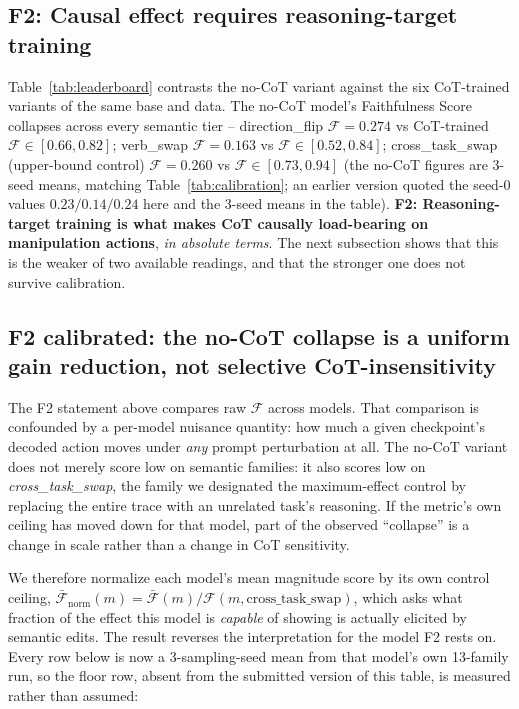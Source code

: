 \documentclass{article}
\begin{document}
\subsection{F2: Causal effect requires reasoning-target training}

Table~\ref{tab:leaderboard} contrasts the no-CoT variant against the six CoT-trained variants of the same base and data. The no-CoT model's Faithfulness Score collapses across every semantic tier -- direction\_flip $\mathcal{F}\!=\!0.274$ vs CoT-trained $\mathcal{F}\!\in\![0.66, 0.82]$; verb\_swap $\mathcal{F}\!=\!0.163$ vs $\mathcal{F}\!\in\![0.52, 0.84]$; cross\_task\_swap (upper-bound control) $\mathcal{F}\!=\!0.260$ vs $\mathcal{F}\!\in\![0.73, 0.94]$ (the no-CoT figures are 3-seed means, matching Table~\ref{tab:calibration}; an earlier version quoted the seed-0 values $0.23/0.14/0.24$ here and the 3-seed means in the table). \textbf{F2: Reasoning-target training is what makes CoT causally load-bearing on manipulation actions}, \emph{in absolute terms}. The next subsection shows that this is the weaker of two available readings, and that the stronger one does not survive calibration.

\subsection{F2 calibrated: the no-CoT collapse is a uniform gain reduction, not selective CoT-insensitivity}
\label{sec:f2_calib}

The F2 statement above compares raw $\mathcal{F}$ across models. That comparison is confounded by a per-model nuisance quantity: how much a given checkpoint's decoded action moves under \emph{any} prompt perturbation at all. The no-CoT variant does not merely score low on semantic families: it also scores low on \emph{cross\_task\_swap}, the family we designated the maximum-effect control by replacing the entire trace with an unrelated task's reasoning. If the metric's own ceiling has moved down for that model, part of the observed ``collapse'' is a change in scale rather than a change in CoT sensitivity.

We therefore normalize each model's mean magnitude score by its own control ceiling, $\bar{\mathcal{F}}_{\text{norm}}(m) = \bar{\mathcal{F}}(m) / \mathcal{F}(m, \text{cross\_task\_swap})$, which asks what fraction of the effect this model is \emph{capable} of showing is actually elicited by semantic edits. The result reverses the interpretation for the model F2 rests on. Every row below is now a 3-sampling-seed mean from that model's own 13-family run, so the floor row, absent from the submitted version of this table, is measured rather than assumed:
\end{document}
